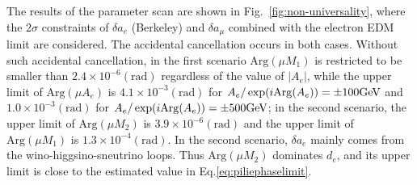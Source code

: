 \documentclass[a4paper,11pt]{article}
\begin{document}
   The results of the parameter scan are shown in Fig.~\ref{fig:non-universality}, where the $2\sigma$ constraints of $\delta a_e$ (Berkeley) and $\delta a_\mu$ combined with the electron EDM limit are considered. The accidental cancellation occurs in both cases. Without such accidental cancellation, in the first scenario $\text{Arg}(\mu M_1)$ is restricted to be smaller than $2.4\times 10^{-6}(\text{rad})$ regardless of the value of $|A_e|$, while the upper limit of $\text{Arg}(\mu A_e)$ is $4.1\times 10^{-3}(\text{rad})$ for $A_e/\exp(i{\rm Arg}(A_e))=\pm 100{\rm GeV}$ and $1.0\times 10^{-3}(\text{rad})$ for $A_e/\exp(i{\rm Arg}(A_e))=\pm 500{\rm GeV}$; in the second scenario, the upper limit of $\text{Arg}(\mu M_2)$ is $3.9\times 10^{-6}(\text{rad})$ and the upper limit of  $\text{Arg}(\mu M_1)$ is $1.3\times 10^{-4}(\text{rad})$. 
   In the second scenario, $\delta a_e$ mainly comes from the wino-higgsino-sneutrino loops. Thus $\text{Arg}(\mu M_2)$ dominates $d_e$, and its upper limit is close to the estimated value in  Eq.\eqref{eq:piliephaselimit}. 
   
\end{document}

